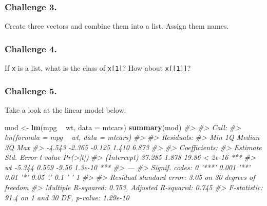 \documentclass[
]{book}
\newenvironment{Shaded}{\begin{snugshade}}{\end{snugshade}}
\newcommand{\CommentTok}[1]{\textcolor[rgb]{0.56,0.35,0.01}{\textit{#1}}}
\newcommand{\DataTypeTok}[1]{\textcolor[rgb]{0.13,0.29,0.53}{#1}}
\newcommand{\KeywordTok}[1]{\textcolor[rgb]{0.13,0.29,0.53}{\textbf{#1}}}
\newcommand{\NormalTok}[1]{#1}
\newcommand{\OperatorTok}[1]{\textcolor[rgb]{0.81,0.36,0.00}{\textbf{#1}}}
\newcommand{\StringTok}[1]{\textcolor[rgb]{0.31,0.60,0.02}{#1}}
\begin{document}
\hypertarget{challenge-3.-6}{%
\subsubsection*{Challenge 3.}\label{challenge-3.-6}}

Create three vectors and combine them into a list. Assign them names.

\hypertarget{challenge-4.-2}{%
\subsubsection*{Challenge 4.}\label{challenge-4.-2}}

If \texttt{x} is a list, what is the class of \texttt{x{[}1{]}}? How about \texttt{x{[}{[}1{]}{]}}?

\hypertarget{challenge-5.-1}{%
\subsubsection*{Challenge 5.}\label{challenge-5.-1}}

Take a look at the linear model below:

\begin{Shaded}
\begin{Highlighting}[]
\NormalTok{mod <-}\StringTok{ }\KeywordTok{lm}\NormalTok{(mpg }\OperatorTok{~}\StringTok{ }\NormalTok{wt, }\DataTypeTok{data =}\NormalTok{ mtcars)}
\KeywordTok{summary}\NormalTok{(mod)}
\CommentTok{#> }
\CommentTok{#> Call:}
\CommentTok{#> lm(formula = mpg ~ wt, data = mtcars)}
\CommentTok{#> }
\CommentTok{#> Residuals:}
\CommentTok{#>    Min     1Q Median     3Q    Max }
\CommentTok{#> -4.543 -2.365 -0.125  1.410  6.873 }
\CommentTok{#> }
\CommentTok{#> Coefficients:}
\CommentTok{#>             Estimate Std. Error t value Pr(>|t|)    }
\CommentTok{#> (Intercept)   37.285      1.878   19.86  < 2e-16 ***}
\CommentTok{#> wt            -5.344      0.559   -9.56  1.3e-10 ***}
\CommentTok{#> ---}
\CommentTok{#> Signif. codes:  0 '***' 0.001 '**' 0.01 '*' 0.05 '.' 0.1 ' ' 1}
\CommentTok{#> }
\CommentTok{#> Residual standard error: 3.05 on 30 degrees of freedom}
\CommentTok{#> Multiple R-squared:  0.753,  Adjusted R-squared:  0.745 }
\CommentTok{#> F-statistic: 91.4 on 1 and 30 DF,  p-value: 1.29e-10}
\end{Highlighting}
\end{Shaded}
\end{document}
